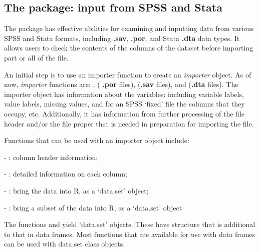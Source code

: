 \subsection{The  package: input from SPSS and Stata}


The  package has effective abilities for
examining and inputting data from various SPSS and Stata formats,
including {\bf .sav}, {\bf .por}, and Stata {\bf .dta} data types. 
It allows users to check the contents of the
columns of the dataset before importing part or all of the file.

An initial step is to use an importer function to create an {\em
  importer} object.  As of now, {\em importer} functions are:
,  ( {\bf .por}
files),  ({\bf .sav} files), and
 ({\bf .dta} files). The importer object has
information about the variables: including variable labels, value
labels, missing values, and for an SPSS `fixed' file the columns that
they occupy, etc. Additionally, it has information from further
processing of the file header and/or the file proper that is
needed in preparation for importing the file.

Functions that can be used with an importer object include:
\begin{itemizz}
\item[-] : column header information;
\item[-] : detailed information on each column;
\item[-] : bring the data into R, as a `data.set' object;
\item[-] : bring a subset of the data into R, as a `data.set' object
\end{itemizz}

  
The functions
 and  yield `data.set' objects.
These have structure that is additional to that in data frames.  Most
functions that are available for use with data frames can be used with
data.set class objects.

